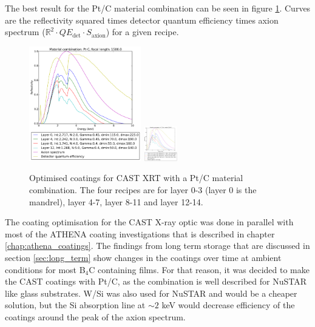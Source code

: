 The best result for the Pt/C material combination can be seen in figure \ref{fig:pt-c_optimized_recipes}. Curves are the reflectivity squared times detector quantum efficiency times axion spectrum ($\mathbb{R}^2\cdot QE_{\text{det}}\cdot S_{\text{axion}}$) for a given recipe.

\begin{figure}[htbp]
  \centering
    \includegraphics[height=5cm]{figures/cast/pt-c_optimized_recipes1.pdf}
    \includegraphics[height=1.5cm]{figures/cast/pt-c_optimized_recipes2.pdf}
  \caption{\footnotesize Optimised coatings for CAST XRT with a Pt/C material combination. The four recipes are for layer 0-3 (layer 0 is the mandrel), layer 4-7, layer 8-11 and layer 12-14.}
  \label{fig:pt-c_optimized_recipes}
\end{figure}



The coating optimisation for the CAST X-ray optic was done in parallel with most of the ATHENA coating investigations that is described in chapter \ref{chap:athena_coatings}. The findings from long term storage that are discussed in section \ref{sec:long_term} show changes in the coatings over time at ambient conditions for most B$_4$C containing films. For that reason, it was decided to make the CAST coatings with Pt/C, as the combination is well described for NuSTAR like glass substrates. W/Si was also used for NuSTAR and would be a cheaper solution, but the Si absorption line at $\sim2$ keV would decrease efficiency of the coatings around the peak of the axion spectrum.

